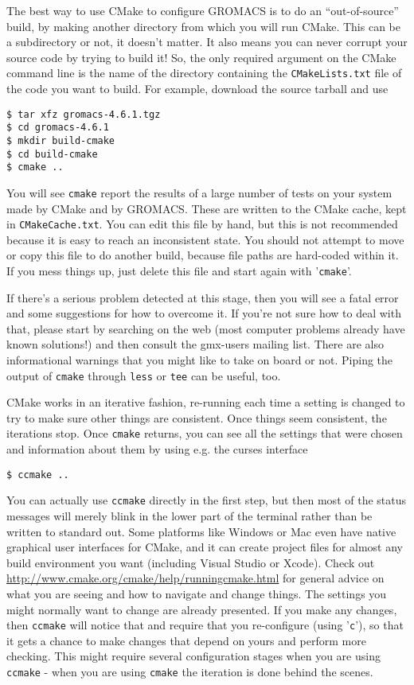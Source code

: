 \documentclass{article}[12pt,a4paper,twoside]
\newcommand{\gromacs}{GROMACS}
\newcommand{\cmake}{CMake}
\begin{document}
The best way to use \cmake{} to configure \gromacs{} is to do an
``out-of-source'' build, by making another directory from which you
will run \cmake{}. This can be a subdirectory or not, it doesn't
matter. It also means you can never corrupt your source code by trying
to build it! So, the only required argument on the \cmake{} command
line is the name of the directory containing the
\verb+CMakeLists.txt+ file of the code you want to build. For
example, download the source tarball and use
\begin{verbatim}
$ tar xfz gromacs-4.6.1.tgz
$ cd gromacs-4.6.1
$ mkdir build-cmake
$ cd build-cmake
$ cmake ..
\end{verbatim}

You will see \verb+cmake+ report the results of a large number of
tests on your system made by \cmake{} and by \gromacs{}. These are
written to the \cmake{} cache, kept in \verb+CMakeCache.txt+. You
can edit this file by hand, but this is not recommended because it is
easy to reach an inconsistent state. You should not attempt to move or
copy this file to do another build, because file paths are hard-coded
within it. If you mess things up, just delete this file and start
again with '\verb+cmake+'.

If there's a serious problem detected at this stage, then you will see
a fatal error and some suggestions for how to overcome it. If you're
not sure how to deal with that, please start by searching on the web
(most computer problems already have known solutions!) and then
consult the gmx-users mailing list. There are also informational
warnings that you might like to take on board or not. Piping the
output of \verb+cmake+ through \verb+less+ or \verb+tee+ can be
useful, too.

\cmake{} works in an iterative fashion, re-running each time a setting
is changed to try to make sure other things are consistent. Once
things seem consistent, the iterations stop. Once \verb+cmake+
returns, you can see all the settings that were chosen and information
about them by using e.g. the curses interface
\begin{verbatim}
$ ccmake ..
\end{verbatim}
You can actually use \verb+ccmake+ directly in the first step, but then
most of the status messages will merely blink in the lower part
of the terminal rather than be written to standard out. Some platforms
like Windows or Mac even have native graphical user interfaces for
\cmake{}, and it can create project files for almost any build environment
you want (including Visual Studio or Xcode).
Check out \url{http://www.cmake.org/cmake/help/runningcmake.html} for
general advice on what you are seeing and how to navigate and change
things. The settings you might normally want to change are already
presented. If you make any changes, then \verb+ccmake+ will notice
that and require that you re-configure (using '\verb+c+'), so that it
gets a chance to make changes that depend on yours and perform more
checking. This might require several configuration stages when you are
using \verb+ccmake+ - when you are using \verb+cmake+ the
iteration is done behind the scenes.
\end{document}
